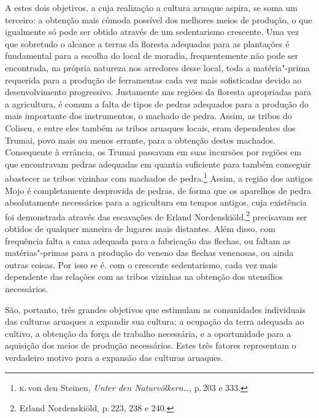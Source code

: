 A estes dois objetivos, a cuja realização a cultura aruaque aspira, se
soma um terceiro: a obtenção mais cômoda possível dos melhores 
meios de produção, o que igualmente só pode
ser obtido através de um sedentarismo crescente. Uma vez que sobretudo
o alcance a terras da floresta adequadas para as plantações é
fundamental para a escolha do local de moradia, frequentemente não pode
ser encontrada, na própria natureza nos arredores desse local, toda a
matéria"-prima requerida para a produção de ferramentas cada vez mais
sofisticadas devido ao desenvolvimento progressivo. Justamente nas
regiões da floresta apropriadas para a agricultura, é comum a falta de tipos 
de pedras adequados para a produção do mais importante dos instrumentos, o machado de pedra. 
Assim, as tribos do Coliseu, e
entre eles também as tribos aruaques locais, eram dependentes dos Trumai, povo mais ou
menos errante, para a
obtenção destes machados. Consequente à errância, os Trumai passavam em suas incursões por regiões em que
encontravam pedras adequadas em quantia suficiente para também conseguir
abastecer as tribos vizinhas com machados de pedra.\footnote{\textsc{k}.\,von den
  Steinen, \textit{Unter den Naturvölkern\ldots}, p.\,203 e
  333.} Assim, a região dos antigos Mojo é completamente desprovida de
pedras, de forma que os aparelhos de pedra absolutamente necessários
para a agricultura em tempos antigos, cuja existência foi demonstrada
através das escavações de Erland Nordenskiöld,\footnote{Erland
  Nordenskiöld, p.\,223, 238 e 240.} precisavam ser obtidos de
qualquer maneira de lugares mais distantes. Além disso, com frequência
falta a cana adequada para a fabricação das flechas, ou faltam as
matérias"-primas para a produção do veneno das flechas venenosas, ou
ainda outras coisas. Por isso se é, com o crescente sedentarismo, cada
vez mais dependente das relações com as tribos vizinhas na obtenção dos
utensílios necessários.

São, portanto, três grandes objetivos que estimulam as comunidades
individuais das culturas aruaques a expandir sua cultura: a ocupação da
terra adequada ao cultivo, a obtenção da força de trabalho necessária, e
a oportunidade para a aquisição dos meios de produção necessários. Estes
três fatores representam o verdadeiro motivo para a expansão das
culturas aruaques.

